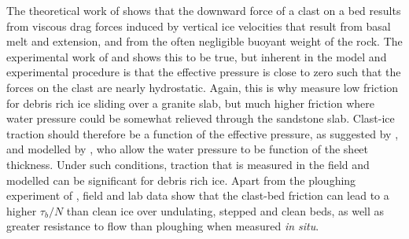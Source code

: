 \documentclass[review]{igs}
\begin{document}
The theoretical work of \cite{Hallet1979} shows that the downward force of a clast on a bed results from viscous drag forces induced by vertical ice velocities that result from basal melt and extension, and from the often negligible buoyant weight of the rock. The experimental work of \cite{Iverson1990} and \cite{Byers2012} shows this to be true, but inherent in the model and experimental procedure is that the effective pressure is close to zero such that the forces on the clast are nearly hydrostatic. Again, this is why \cite{Zoet2013a} measure low friction for debris rich ice sliding over a granite slab, but much higher friction where water pressure could be somewhat relieved through the sandstone slab. Clast-ice traction should therefore be a function of the effective pressure, as suggested by \cite{Boulton1979a}, and modelled by \cite{Cohen2005}, who allow the water pressure to be function of the sheet thickness. Under such conditions, traction that is measured in the field \citep{Iverson2003,Cohen2005} and modelled \citep{Cohen2005} can be significant for debris rich ice. Apart from the ploughing experiment of \cite{Thomason2008}, field and lab data show that the clast-bed friction can lead to a higher $\tau_b/N$ than clean ice over undulating, stepped and clean beds, as well as greater resistance to flow than ploughing when measured \emph{in situ}. 
%
%
%
%
\end{document}
